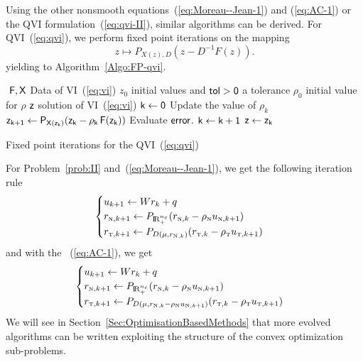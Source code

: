 Using the other nonsmooth equations~(\ref{eq:Moreau--Jean-1}) and (\ref{eq:AC-1}) or the QVI formulation~(\ref{eq:qvi-II}), similar algorithms can be derived. For QVI~(\ref{eq:qvi}), we perform fixed point iterations on the mapping
\begin{equation}
  \label{eq:skew-fixed-point-qvi}
   z \mapsto P_{X(z),D}(z-D^{-1} F(z)).
\end{equation}
yielding to Algorithm~\ref{Algo:FP-qvi}. 
\begin{algorithm}
  \begin{algorithmic}
    {\sf
      \STATE $ $
      \REQUIRE $\sf F,X$ Data of VI~(\ref{eq:vi})
      \REQUIRE $z_0$ initial values and $\sf tol >0$ a tolerance  
      \REQUIRE $\rho_0$ initial value for $\rho$
      \ENSURE  $\sf z$ solution of VI~(\ref{eq:vi})
      \STATE   $\sf k \leftarrow 0$ 
      \STATE Update the value of $\rho_k$
      \STATE $\sf z_{k+1} \leftarrow P_{X(z_k)}(z_k - \rho_k\,F(z_k))$
      \STATE Evaluate $\sf error$.
      \STATE $\sf k \leftarrow k+1$
      \ENDWHILE
      \STATE $\sf z \leftarrow z_{k}$ 
    }
  \end{algorithmic}
  \caption{Fixed point iterations for the QVI~(\ref{eq:qvi})}  \label{Algo:FP-qvi}
\end{algorithm}
For Problem~\ref{prob:II} and~(\ref{eq:Moreau--Jean-1}), we get the following iteration rule
\begin{equation}
  \label{eq:FP-MJ-II}
  \begin{cases}
    u_{k+1} \leftarrow W r_{k} +q\\
    r_{\n,k+1} \leftarrow P_{\RR^{n_c}_+}(r_{\n,k} -\rho_\n u_{\n,k+1}) \\
    r_{\t,k+1} \leftarrow P_{D(\mu,r_{\n,k})}(r_{\t,k}-\rho_\t u_{\t,k+1})
  \end{cases}
\end{equation}
and with the ~(\ref{eq:AC-1}), we get
\begin{equation}
  \label{eq:FP-AC-II}
  \begin{cases}
    u_{k+1} \leftarrow W r_{k} +q\\
    r_{\n,k+1} \leftarrow P_{\RR^{n_c}_+}(r_{\n,k} -\rho_\n u_{\n,k+1}) \\
    r_{\t,k+1} \leftarrow P_{D(\mu,r_{\n,k}-\rho_\n u_{\n,k+1} )}(r_{\t,k}-\rho_\t u_{\t,k+1})
  \end{cases}
\end{equation}
We will see in Section~\ref{Sec:OptimisationBasedMethods} that more evolved algorithms can be written exploiting the structure of the convex optimization sub-problems.


